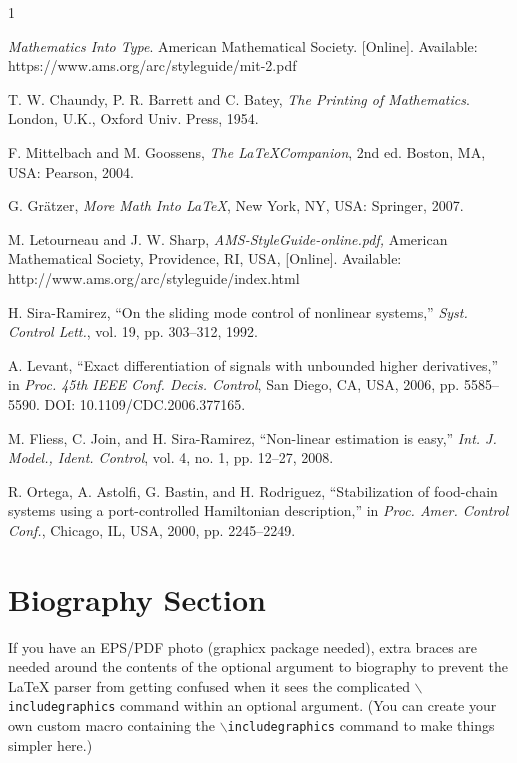 \documentclass[lettersize,journal]{IEEEtran}
\begin{document}
\begin{thebibliography}{1}


{\it{Mathematics Into Type}}. American Mathematical Society. [Online]. Available: https://www.ams.org/arc/styleguide/mit-2.pdf

T. W. Chaundy, P. R. Barrett and C. Batey, {\it{The Printing of Mathematics}}. London, U.K., Oxford Univ. Press, 1954.

F. Mittelbach and M. Goossens, {\it{The \LaTeX Companion}}, 2nd ed. Boston, MA, USA: Pearson, 2004.

G. Gr\"atzer, {\it{More Math Into LaTeX}}, New York, NY, USA: Springer, 2007.

M. Letourneau and J. W. Sharp, {\it{AMS-StyleGuide-online.pdf,}} American Mathematical Society, Providence, RI, USA, [Online]. Available: http://www.ams.org/arc/styleguide/index.html

H. Sira-Ramirez, ``On the sliding mode control of nonlinear systems,'' \textit{Syst. Control Lett.}, vol. 19, pp. 303--312, 1992.

A. Levant, ``Exact differentiation of signals with unbounded higher derivatives,''  in \textit{Proc. 45th IEEE Conf. Decis.
Control}, San Diego, CA, USA, 2006, pp. 5585--5590. DOI: 10.1109/CDC.2006.377165.

M. Fliess, C. Join, and H. Sira-Ramirez, ``Non-linear estimation is easy,'' \textit{Int. J. Model., Ident. Control}, vol. 4, no. 1, pp. 12--27, 2008.

R. Ortega, A. Astolfi, G. Bastin, and H. Rodriguez, ``Stabilization of food-chain systems using a port-controlled Hamiltonian description,'' in \textit{Proc. Amer. Control Conf.}, Chicago, IL, USA,
2000, pp. 2245--2249.

\end{thebibliography}


\newpage

\section{Biography Section}
If you have an EPS/PDF photo (graphicx package needed), extra braces are
 needed around the contents of the optional argument to biography to prevent
 the LaTeX parser from getting confused when it sees the complicated
 $\backslash${\tt{includegraphics}} command within an optional argument. (You can create
 your own custom macro containing the $\backslash${\tt{includegraphics}} command to make things
 simpler here.)
\end{document}
